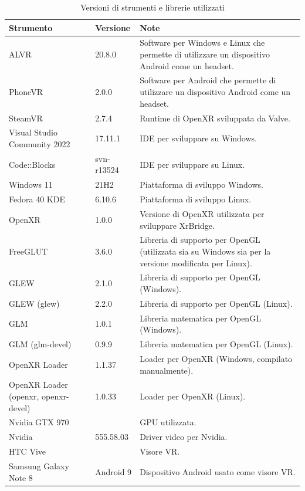 \documentclass[twoside]{supsistudent}
\begin{document}
\begin{table}[H]
  \caption{Versioni di strumenti e librerie utilizzati}
  \begin{center}
    \begin{tabular}{ m{4cm} m{2cm} m{7cm} }
      Strumento & Versione & Note \\
      \hline
      ALVR & 20.8.0 & Software per Windows e Linux che permette di utilizzare un dispositivo Android come un headset. \\
      PhoneVR & 2.0.0 & Software per Android che permette di utilizzare un dispositivo Android come un headset. \\
      SteamVR & 2.7.4 & Runtime di OpenXR sviluppata da Valve. \\
      Visual Studio Community 2022 & 17.11.1 & IDE per sviluppare su Windows. \\
      Code::Blocks & svn-r13524 & IDE per sviluppare su Linux. \\
      Windows 11 & 21H2 & Piattaforma di sviluppo Windows. \\
      Fedora 40 KDE & 6.10.6 & Piattaforma di sviluppo Linux. \\
      OpenXR & 1.0.0 & Versione di OpenXR utilizzata per sviluppare XrBridge. \\
      FreeGLUT & 3.6.0 & Libreria di supporto per OpenGL (utilizzata sia su Windows sia per la versione modificata per Linux). \\
      GLEW & 2.1.0 & Libreria di supporto per OpenGL (Windows). \\
      GLEW (glew) & 2.2.0 & Libreria di supporto per OpenGL (Linux). \\
      GLM & 1.0.1 & Libreria matematica per OpenGL (Windows).\\
      GLM (glm-devel) & 0.9.9 & Libreria matematica per OpenGL (Linux). \\
      OpenXR Loader & 1.1.37 & Loader per OpenXR (Windows, compilato manualmente). \\
      OpenXR Loader (openxr, openxr-devel) & 1.0.33 & Loader per OpenXR (Linux). \\
      Nvidia GTX 970 & & GPU utilizzata. \\
      Nvidia & 555.58.03 & Driver video per Nvidia. \\
      HTC Vive & & Visore VR. \\
      Samsung Galaxy Note 8 & Android 9 & Dispositivo Android usato come visore VR. \\
    \end{tabular}
  \end{center}
\end{table}
\end{document}
